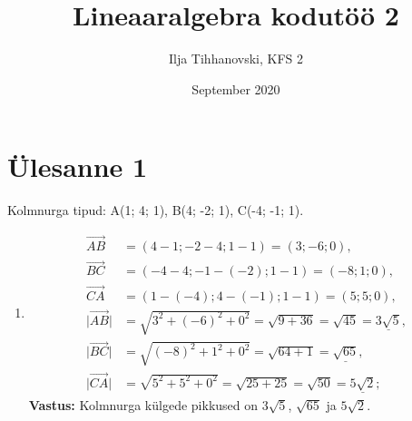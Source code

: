 \documentclass[10pt, a4paper]{article}
\title{Lineaaralgebra kodutöö 2}
\author{Ilja Tihhanovski, KFS 2}
\date{September 2020}
\begin{document}
    \section{Ülesanne 1}
        Kolmnurga tipud: A(1; 4; 1), B(4; -2; 1), C(-4; -1; 1).
        \begin{enumerate}
            \item %
                \begin{align}
                    \nonumber
                    \vec{AB} &= (4 - 1; -2 - 4; 1 - 1) = (3; -6; 0),\\ \nonumber
                    \vec{BC} &= (-4 - 4; -1 - (-2); 1 - 1) = (-8; 1; 0),\\ \nonumber
                    \vec{CA} &= (1 - (-4); 4 - (-1); 1 - 1) = (5; 5; 0), \\ \nonumber
                    \lvert\vec{AB}\rvert &= \sqrt{3^2 + (-6)^2 + 0^2} = \sqrt{9 + 36} = \sqrt{45} = \underline{3\sqrt{5}}, \\ \nonumber
                    \lvert\vec{BC}\rvert &= \sqrt{(-8)^2 + 1^2 + 0^2} = \sqrt{64 + 1} = \underline{\sqrt{65}}, \\ \nonumber
                    \lvert\vec{CA}\rvert &= \sqrt{5^2 + 5^2 + 0^2} = \sqrt{25 + 25} = \sqrt{50} = \underline{5\sqrt{2}};
                \end{align}
                \textbf{Vastus: } Kolmnurga külgede pikkused on $3\sqrt{5}$, $\sqrt{65}$ ja $5\sqrt{2}$.
                

\end{enumerate}
\end{document}
